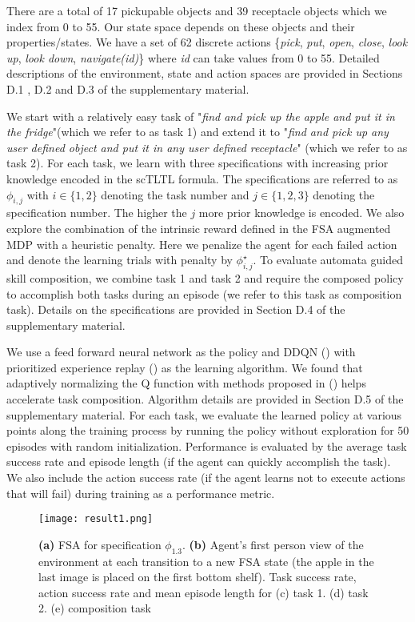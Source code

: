 \documentclass{article}
\begin{document}
There are a total of 17 pickupable objects and 39 receptacle objects which we index from 0 to 55. Our state space depends on these objects and their properties/states. We have a set of 62 discrete actions \{\textit{pick}, \textit{put}, \textit{open}, \textit{close}, \textit{look up}, \textit{look down}, \textit{navigate(id)}\} where \textit{id} can take values from 0 to 55. Detailed descriptions of the environment, state and action spaces are provided in Sections D.1 , D.2 and D.3 of the supplementary material.


We start with a relatively easy task of "\textit{find and pick up the apple and put it in the fridge}"(which we refer to as task 1) and extend it to "\textit{find and pick up any user defined object and put it in any user defined receptacle}" (which we refer to as task 2). For each task, we learn with three specifications with increasing prior knowledge encoded in the scTLTL formula. The specifications are referred to as $\phi_{i,j}$ with $i \in \{1,2\}$ denoting the task number and $j \in \{1,2,3\}$ denoting the specification number. The higher the $j$ more prior knowledge is encoded. We also explore the combination of the intrinsic reward defined in the FSA augmented MDP with a heuristic penalty. Here we penalize the agent for each failed action and denote the learning trials with penalty by $\phi_{i,j}^\star$.  To evaluate automata guided skill composition, we combine task 1 and task 2 and require the composed policy to accomplish both tasks during an episode (we refer to this task as composition task). Details on the specifications are provided in Section D.4 of the supplementary material. 


We use a feed forward neural network as the policy and DDQN (\cite{van2016deep}) with prioritized experience replay (\cite{schaul2015prioritized}) as the learning algorithm. We found that adaptively normalizing the Q function with methods proposed in (\cite{van2016learning}) helps accelerate task composition. Algorithm details are provided in Section D.5 of the supplementary material. For each task, we evaluate the learned policy at various points along the training process by running the policy without exploration for 50 episodes with random initialization. Performance is evaluated by the average task success rate and episode length (if the agent can quickly accomplish the task). We also include the action success rate (if the agent learns not to execute actions that will fail) during training as a performance metric. 

\begin{figure*}[h] 
\vspace{-0.1in}
\begin{center}
\texttt{[image: result1.png]}
\vspace{-0.1in}
\caption{\textbf{(a)} FSA for specification $\phi_{1.3}$. \textbf{(b)} Agent's first person view of the environment at each transition to a new FSA state (the apple in the last image is placed on the first bottom shelf). Task success rate, action success rate and mean episode length for (c) task 1. (d) task 2. (e) composition task}\label{fig:3}
\end{center}
\end{figure*}
\end{document}
